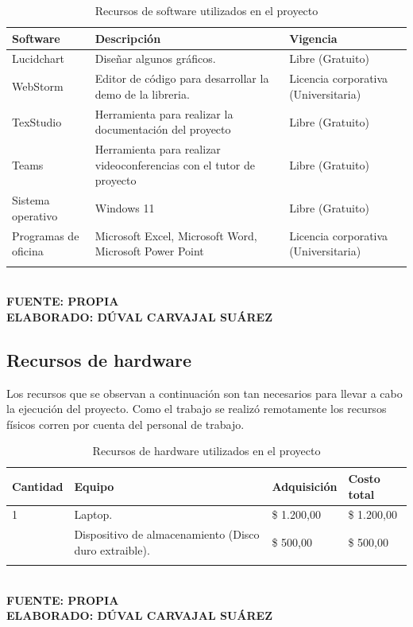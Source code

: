 \begin{table}[h!]
	\caption{Recursos de software utilizados en el proyecto}
	\begin{tabular}{p{3cm}p{6cm}p{5cm}}
		\toprule
		\textbf{Software} & \textbf{Descripción} & \textbf{Vigencia} \\
		\midrule
		Lucidchart & Diseñar algunos gráficos. & Libre (Gratuito) \\
		\addlinespace
		WebStorm & Editor de código para desarrollar la demo de la libreria. & Licencia corporativa (Universitaria) \\
		\addlinespace
		TexStudio & Herramienta para realizar la documentación del proyecto & Libre (Gratuito) \\
		\addlinespace
		Teams & Herramienta para realizar videoconferencias con el tutor de proyecto & Libre (Gratuito) \\
		\addlinespace
		Sistema operativo & Windows 11 & Libre (Gratuito) \\
		\addlinespace
		Programas de oficina & Microsoft Excel, Microsoft Word, Microsoft Power Point & Licencia corporativa (Universitaria) \\
		\addlinespace
		\bottomrule
	\end{tabular}
	
	\textbf{\\ FUENTE: PROPIA \\ ELABORADO: DÚVAL CARVAJAL SUÁREZ}
\end{table}

\subsection{Recursos de hardware}

Los recursos que se observan a continuación son tan necesarios para llevar a cabo la ejecución del proyecto. Como el trabajo se realizó remotamente los recursos físicos corren por cuenta del personal de trabajo.

\begin{table}[h!]
	\caption{Recursos de hardware utilizados en el proyecto}
	\begin{tabular}{p{2cm}p{5cm}p{3cm}p{3cm}}
		\toprule
		\textbf{Cantidad} & \textbf{Equipo} & \textbf{Adquisición} & \textbf{Costo total} \\
		\midrule
		1 & Laptop. & \$ 1.200,00 & \$ 1.200,00  \\
		\addlinespace
		1 & Dispositivo de almacenamiento (Disco duro extraible). & \$ 500,00 & \$ 500,00  \\
		\addlinespace
		\bottomrule
	\end{tabular}

	\textbf{\\ FUENTE: PROPIA \\ ELABORADO: DÚVAL CARVAJAL SUÁREZ}
\end{table}


